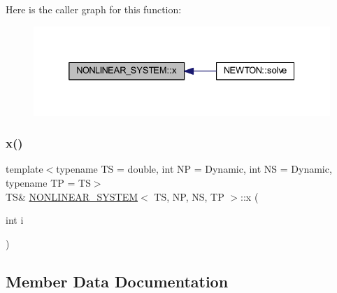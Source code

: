Here is the caller graph for this function\+:
\nopagebreak
\begin{figure}[H]
\begin{center}
\leavevmode
\includegraphics[width=332pt]{class_n_o_n_l_i_n_e_a_r___s_y_s_t_e_m_a74d8eaa53624eae38a6f2e6b5bdd4381_icgraph}
\end{center}
\end{figure}
\mbox{\label{class_n_o_n_l_i_n_e_a_r___s_y_s_t_e_m_aabd6041ce7d6aaad8ce55e03c2efde1e}} 
\subsubsection{\texorpdfstring{x()}{x()}\hspace{0.1cm}{\footnotesize\ttfamily [2/2]}}
{\footnotesize\ttfamily template$<$typename TS = double, int NP = Dynamic, int NS = Dynamic, typename TP = TS$>$ \\
TS\& \mbox{\hyperlink{class_n_o_n_l_i_n_e_a_r___s_y_s_t_e_m}{N\+O\+N\+L\+I\+N\+E\+A\+R\+\_\+\+S\+Y\+S\+T\+EM}}$<$ TS, NP, NS, TP $>$\+::x (\begin{DoxyParamCaption}\item[{int}]{i }\end{DoxyParamCaption})\hspace{0.3cm}{\ttfamily [inline]}}



\subsection{Member Data Documentation}
\mbox{\label{class_n_o_n_l_i_n_e_a_r___s_y_s_t_e_m_aee48110f36d056d217437af5e7cc5447}} 
